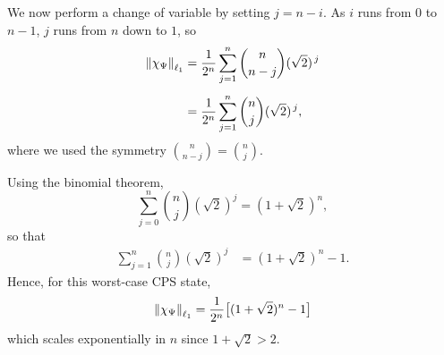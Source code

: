 \documentclass[a4paper,twocolumn,11pt,unpublished]{quantumarticle}
\begin{document}
We now perform a change of variable by setting $j = n-i$. As $i$ runs from $0$ to $n-1$, $j$ runs from $n$ down to $1$, so
\begin{align}
    \left\lVert\chi_\Psi\right\rVert_{\ell_1}
    &=
    \dfrac{1}{2^n}
    \sum_{j=1}^{n}
    \binom{n}{n-j}
    (\sqrt{2})^{\,j} \\[4pt]
    &=
    \dfrac{1}{2^n}
    \sum_{j=1}^{n}
    \binom{n}{j}
    (\sqrt{2})^{\,j},
\end{align}
where we used the symmetry $\binom{n}{n-j} = \binom{n}{j}$.

Using the binomial theorem,
\begin{equation}
    \sum_{j=0}^{n} \binom{n}{j} (\sqrt{2})^j = (1+\sqrt{2})^n,
\end{equation}
so that
\begin{align}
    \sum_{j=1}^{n} \binom{n}{j} (\sqrt{2})^j
    &= (1+\sqrt{2})^n - 1.
\end{align}
Hence, for this worst-case CPS state,
\begin{equation}
    \left\lVert\chi_\Psi\right\rVert_{\ell_1}
    = \dfrac{1}{2^n} \bigl[ (1+\sqrt{2})^n - 1 \bigr]
\end{equation}
which scales exponentially in $n$ since $1+\sqrt 2 > 2$.
\end{document}
